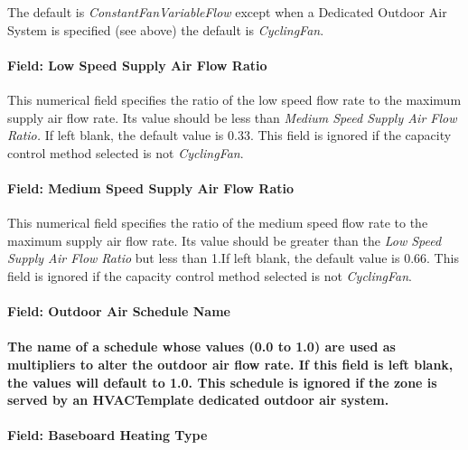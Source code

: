 The default is \emph{ConstantFanVariableFlow} except when a Dedicated Outdoor Air System is specified (see above) the default is  \emph{CyclingFan}.

\paragraph{Field: Low Speed Supply Air Flow Ratio}\label{field-low-speed-supply-air-flow-ratio}

This numerical field specifies the ratio of the low speed flow rate to the maximum supply air flow rate. Its value should be less than \emph{Medium Speed Supply Air Flow Ratio.} If left blank, the default value is 0.33. This field is ignored if the capacity control method selected is not \emph{CyclingFan}.

\paragraph{Field: Medium Speed Supply Air Flow Ratio}\label{field-medium-speed-supply-air-flow-ratio}

This numerical field specifies the ratio of the medium speed flow rate to the maximum supply air flow rate. Its value should be greater than the \emph{Low Speed Supply Air Flow Ratio} but less than 1.If left blank, the default value is 0.66. This field is ignored if the capacity control method selected is not \emph{CyclingFan}.

\paragraph{Field: Outdoor Air Schedule Name}

\paragraph{The name of a schedule whose values (0.0 to 1.0) are used as multipliers to alter the outdoor air flow rate. If this field is left blank, the values will default to 1.0. This schedule is ignored if the zone is served by an HVACTemplate dedicated outdoor air system.}\label{the-name-of-a-schedule-whose-values-0.0-to-1.0-are-used-as-multipliers-to-alter-the-outdoor-air-flow-rate.-if-this-field-is-left-blank-the-values-will-default-to-1.0.-this-schedule-is-ignored-if-the-zone-is-served-by-an-hvactemplate-dedicated-outdoor-air-system.}

\paragraph{Field: Baseboard Heating Type}\label{field-baseboard-heating-type-1}

